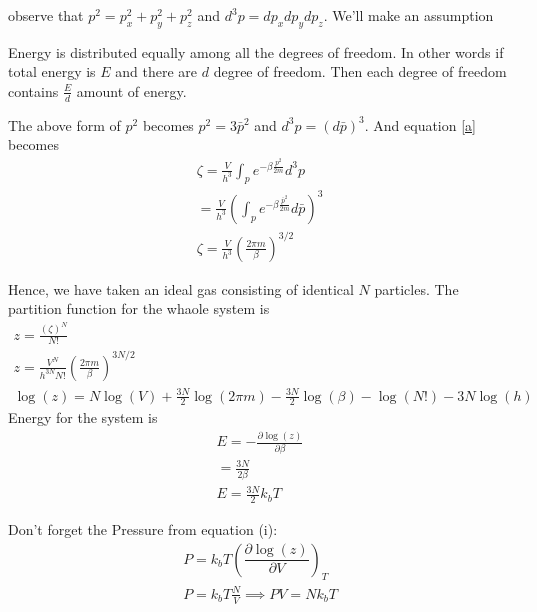 \documentclass{tufte-handout}
\begin{document}
observe that \(p^2 = p_x ^2 + p_y ^2 + p_z ^2\) and \(d^3 p= d p_x dp_y dp_z\). 
We'll make an assumption

\begin{assume}
	Energy is distributed equally among all the degrees of freedom.
	In other words if total energy is \(E\) and there are \(d\) degree of freedom. Then each
	degree of freedom contains \(\frac{E}{d}\) amount of energy.
\end{assume}

The above form of \(p^2\) becomes \(p^2 = 3 \bar{p} ^2\) and \(d^3 p = (d \bar{p})^3\). And equation 
\ref{a} becomes 
\[\begin{gathered}
	\zeta = \frac{V}{h^3}  \int_p e^{-\beta \frac{p^2}{2m}}d^3p \\
	= \frac{V}{h^3} \left(\int_p e^{-\beta \frac{\bar{p}^2}{2m}}d \bar{p}\right)^3\\
	\zeta = \frac{V}{h^3}\left(\frac{2\pi m}{\beta}\right)^{3/2}
\end{gathered}\]

Hence, we have taken an ideal gas consisting of identical \(N\) particles. 
The partition function for the whaole system is 
\[\begin{gathered}
	z = \frac{(\zeta)^N}{N!}\\
	z = \frac{V^N}{h^{3N}N!}\left(\frac{2\pi m}{\beta}\right)^{3N/2}\\
	\log(z) = N \log(V) + \frac{3N}{2}
\log(2\pi m)-  \frac{3N}{2}\log(\beta) - \log(N!) - 3N\log(h)\end{gathered}\]
Energy for the system is 
\[\begin{gathered}
	E = - \frac{\partial \log(z)}{\partial \beta} \\
	= \frac{3N}{2\beta} \\
	\boxed{E = \frac{3N}{2} k_b T}
\end{gathered}\]

Don't forget the Pressure from equation (i):
\[\begin{gathered}
	P = k_b T \left (\dfrac{\partial \log(z)}{\partial V} \right ) _{T}\\
	P = k_b T \frac{N}{V} \implies \boxed{PV = N k_b T}
 \end{gathered}\]
\end{document}
